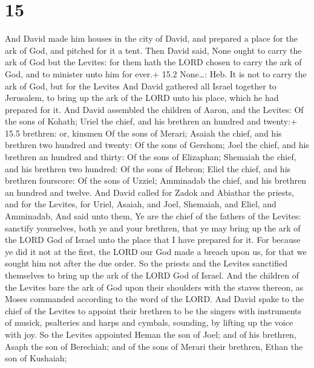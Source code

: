 \hypertarget{section-14}{%
\section{15}\label{section-14}}

 And David made him houses in the city of David, and
prepared a place for the ark of God, and pitched for it a tent.
 Then David said, None ought to carry the ark of God but the
Levites: for them hath the LORD chosen to carry the ark of God, and to
minister unto him for ever.+ 15.2 None\ldots: Heb. It is not to carry
the ark of God, but for the Levites  And David gathered all
Israel together to Jerusalem, to bring up the ark of the LORD unto his
place, which he had prepared for it.  And David assembled
the children of Aaron, and the Levites:  Of the sons of
Kohath; Uriel the chief, and his brethren an hundred and twenty:+ 15.5
brethren: or, kinsmen  Of the sons of Merari; Asaiah the
chief, and his brethren two hundred and twenty:  Of the sons
of Gershom; Joel the chief, and his brethren an hundred and thirty:
 Of the sons of Elizaphan; Shemaiah the chief, and his
brethren two hundred:  Of the sons of Hebron; Eliel the
chief, and his brethren fourscore:  Of the sons of Uzziel;
Amminadab the chief, and his brethren an hundred and twelve.
 And David called for Zadok and Abiathar the priests, and
for the Levites, for Uriel, Asaiah, and Joel, Shemaiah, and Eliel, and
Amminadab,  And said unto them, Ye are the chief of the
fathers of the Levites: sanctify yourselves, both ye and your brethren,
that ye may bring up the ark of the LORD God of Israel unto the place
that I have prepared for it.  For because ye did it not at
the first, the LORD our God made a breach upon us, for that we sought
him not after the due order.  So the priests and the
Levites sanctified themselves to bring up the ark of the LORD God of
Israel.  And the children of the Levites bare the ark of
God upon their shoulders with the staves thereon, as Moses commanded
according to the word of the LORD.  And David spake to the
chief of the Levites to appoint their brethren to be the singers with
instruments of musick, psalteries and harps and cymbals, sounding, by
lifting up the voice with joy.  So the Levites appointed
Heman the son of Joel; and of his brethren, Asaph the son of Berechiah;
and of the sons of Merari their brethren, Ethan the son of Kushaiah;

